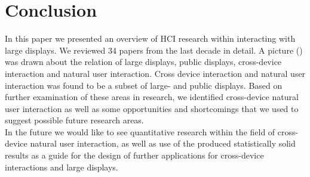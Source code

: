 \section{Conclusion}\label{Sec:Conclusion}
In this paper we presented an overview of HCI research within interacting with large displays. We reviewed 34 papers from the last decade in detail. A picture () was drawn about the relation of large displays, public displays, cross-device interaction and natural user interaction. Cross device interaction and natural user interaction was found to be a subset of large- and public displays. Based on further examination of these areas in research, we identified cross-device natural user interaction as well as some opportunities and shortcomings that we used to suggest possible future research areas.\\
In the future we would like to see quantitative research within the field of cross-device natural user interaction, as well as use of the produced statistically solid results as a guide for the design of further applications for cross-device interactions and large displays.